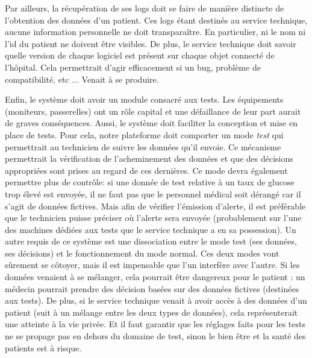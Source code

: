 Par ailleurs, la récupération de ses logs doit se faire de manière distincte de l'obtention des données d'un patient. Ces logs
étant destinés au service technique, aucune information personnelle ne doit transparaître. En particulier, ni le nom ni l'id du
patient ne doivent être visibles. De plus, le service technique doit savoir quelle version de chaque logiciel est présent sur
chaque objet connecté de l'hôpital. Cela permettrait d'agir efficacement si un bug, problème de compatibilité, etc ... Venait à se
produire.
\newline

Enfin, le système doit avoir un module consacré aux tests. Les équipements (moniteurs, passerelles) ont un rôle capital et une
défaillance de leur part aurait de graves conséquences. Aussi, le système doit faciliter la conception et mise en place de tests.
Pour cela, notre plateforme doit comporter un mode \textit{test} qui permettrait au technicien de suivre les données qu'il envoie.
Ce mécanisme permettrait la vérification de l'acheminement des données et que des décisions appropriées sont prises au regard de
ces dernières. Ce mode devra également permettre plus de contrôle: si une donnée de test relative à un taux de glucose trop élevé
est envoyée, il ne faut pas que le personnel médical soit dérangé car il s'agit de données fictives. Mais afin de vérifier
l'émission d'alerte, il est préférable que le technicien puisse préciser où l'alerte sera envoyée (probablement sur l'une des
machines dédiées aux tests que le service technique a en sa possession). Un autre requis de ce système est une dissociation entre
le mode test (ses données, ses décisions) et le fonctionnement du mode normal. Ces deux modes vont sûrement se côtoyer, mais il
est impensable que l'un interfère avec l'autre. Si les données venaient à se mélanger, cela pourrait être dangereux pour le
patient : un médecin pourrait prendre des décision basées sur des données fictives (destinées aux tests). De plus, si le service
technique venait à avoir accès à des données d'un patient (suit à un mélange entre les deux types de données), cela
représenterait une atteinte à la vie privée. Et il faut garantir que les réglages faits pour les tests ne se propage pas en dehors
du domaine de test, sinon le bien être et la santé des patients est à risque.
